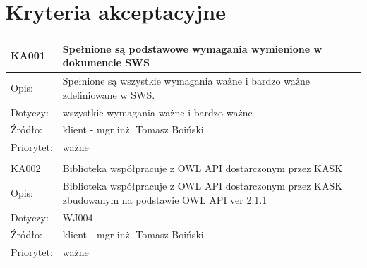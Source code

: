 \documentclass[a4paper,10pt]{article}
\begin{document}
\section{Kryteria akceptacyjne}


\begin{center}

\begin{tabular}{|m{3cm}|m{9cm}|} \hline

KA001 & Spełnione są podstawowe wymagania wymienione w dokumencie SWS \\ \hline
Opis: & Spełnione są wszystkie wymagania ważne i bardzo ważne zdefiniowane w SWS. \\ \hline
Dotyczy: & wszystkie wymagania ważne i bardzo ważne \\ \hline
Źródło: & klient - mgr inż. Tomasz Boiński \\ \hline
Priorytet: & ważne  \\ \hline %

\multicolumn{2}{c}{} \\
 \hline

KA002 & Biblioteka współpracuje z OWL API dostarczonym przez KASK \\ \hline
Opis: & Biblioteka współpracuje z OWL API dostarczonym przez KASK zbudowanym na podstawie OWL API ver 2.1.1\\ \hline
Dotyczy: & WJ004 \\ \hline
Źródło: & klient - mgr inż. Tomasz Boiński \\ \hline
Priorytet: & ważne  \\ \hline %

\end{tabular}

\end{center}
\end{document}
